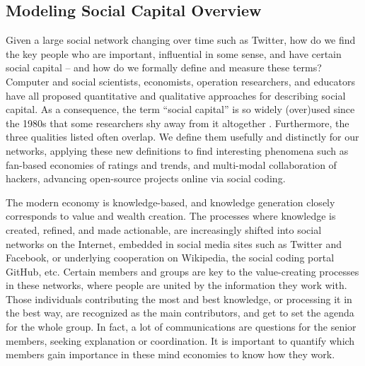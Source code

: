 \documentclass[10pt,oneside]{memoir}
\begin{document}
\begin{Spacing}{2}
\pagebreak \section{Modeling Social Capital Overview}
\label{modelingsocialcapitaloverview}

Given a large social network changing over time such as Twitter, how do we find the key people who are important, influential in some sense, and have certain social capital -- and how do we formally define and measure these terms? Computer and social scientists, economists, operation researchers, and educators have all proposed quantitative and qualitative approaches for describing social capital. As a consequence, the term ``social capital'' is so widely (over)used since the 1980s that some researchers shy away from it altogether \cite{jackson2008social}. Furthermore, the three qualities listed often overlap. We define them usefully and distinctly for our networks, applying these new definitions to find interesting phenomena such as fan-based economies of ratings and trends, and multi-modal collaboration of hackers, advancing open-source projects online via social coding.


The modern economy is knowledge-based, and knowledge generation closely corresponds to value and wealth creation. The processes where knowledge is created, refined, and made actionable, are increasingly shifted into social networks on the Internet, embedded in social media sites such as Twitter and Facebook, or underlying cooperation on Wikipedia, the social coding portal GitHub, etc. Certain members and groups are key to the value-creating processes in these networks, where people are united by the information they work with. Those individuals contributing the most and best knowledge, or processing it in the best way, are recognized as the main contributors, and get to set the agenda for the whole group. In fact, a lot of communications are questions for the senior members, seeking explanation or coordination. It is important to quantify which members gain importance in these mind economies to know how they work.



\end{Spacing}
\end{document}
